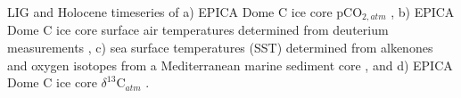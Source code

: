 LIG and Holocene timeseries of a) EPICA Dome C ice core pCO$_{2, atm}$ \citep{eggleston2016co2}, b) EPICA Dome C ice core surface air temperatures determined from deuterium measurements \citep{jouzel2007epica}, c) sea surface temperatures (SST) determined from alkenones and oxygen isotopes from a Mediterranean marine sediment core \citep{martrat2004sea}, and d) EPICA Dome C ice core $\delta^{13}$C$_{atm}$ \citep{elsig2009carbon,schneider2013reconstruction}.
